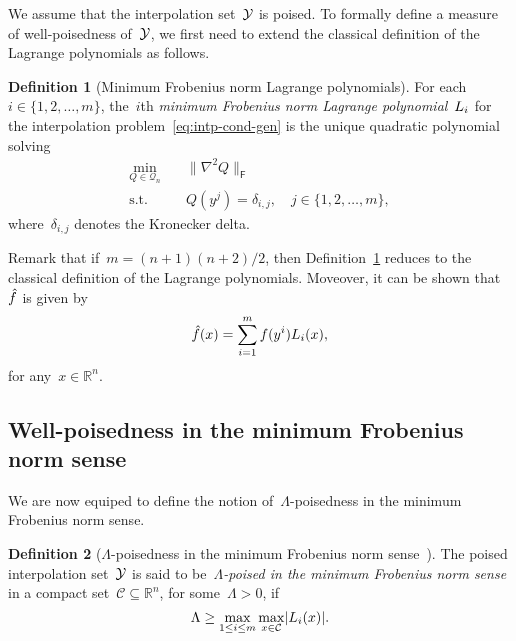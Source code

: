 \documentclass[draft]{article}
\numberwithin{equation}{section}
\theoremstyle{definition}
\newtheorem{definition}{Definition}[section]
\theoremstyle{plain}
\newcommand{\abs}[2][]{#1\lvert#2#1\rvert}
\newcommand{\lagp}[1][]{L\ifblank{#1}{}{_{#1}}}
\newcommand{\norm}[2][]{#1\lVert#2#1\rVert}
\newcommand{\obj}{f}
\newcommand{\objm}[1][]{\hat{\obj}\ifblank{#1}{}{^{#1}}}
\newcommand{\qpoly}{\mathcal{Q}_n}
\newcommand{\R}{\mathbb{R}}
\newcommand{\set}[2][]{#1\{#2#1\}}
\newcommand{\xpt}[1][]{\mathcal{Y}\ifblank{#1}{}{^{#1}}}
\begin{document}
We assume that the interpolation set~$\xpt$ is poised.
To formally define a measure of well-poisedness of~$\xpt$, we first need to extend the classical definition of the Lagrange polynomials as follows.

\begin{definition}[Minimum Frobenius norm Lagrange polynomials]
    \label{def:min-norm-lagp}
    For each~$i \in \set{1, 2, \dots, m}$, the~$i$th \emph{minimum Frobenius norm Lagrange polynomial}~$\lagp[i]$ for the interpolation problem~\eqref{eq:intp-cond-gen} is the unique quadratic polynomial solving
    \begin{equation*}
        \begin{aligned}
            \min_{Q \in \qpoly} & \quad \norm{\nabla^2 Q}_{\mathsf{F}}\\
            \text{s.t.}         & \quad Q(y^j) = \delta_{i, j}, \quad j \in \set{1, 2, \dots, m},
        \end{aligned}
    \end{equation*}
    where~$\delta_{i, j}$ denotes the Kronecker delta.
\end{definition}

Remark that if~$m = (n + 1) (n + 2) / 2$, then Definition~\ref{def:min-norm-lagp} reduces to the classical definition of the Lagrange polynomials.
Moveover, it can be shown that~$\objm$ is given by
\begin{equation*}
    \objm(x) = \sum_{i = 1}^m \obj(y^i) \lagp[i](x),
\end{equation*}
for any~$x \in \R^n$.

\subsection{Well-poisedness in the minimum Frobenius norm sense}

We are now equiped to define the notion of~$\Lambda$-poisedness in the minimum Frobenius norm sense.

\begin{definition}[$\Lambda$-poisedness in the minimum Frobenius norm sense~{\cite[Definition~5.6]{Conn_Scheinberg_Vicente_2009}}]
    \label{def:lambda-p}
    The poised interpolation set~$\xpt$ is said to be~\emph{$\Lambda$-poised in the minimum Frobenius norm sense} in a compact set~$\mathcal{C} \subseteq \R^n$, for some~$\Lambda > 0$, if
    \begin{equation*}
        \Lambda \ge \max_{1 \le i \le m} \max_{x \in \mathcal{C}} \abs{\lagp[i](x)}.
    \end{equation*}
\end{definition}
\end{document}
